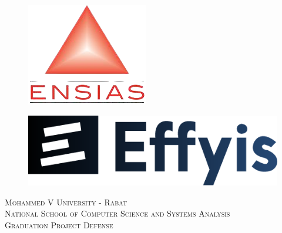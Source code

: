 \begin{titlepage}
\newcommand{\HRule}{\rule{\linewidth}{0.5mm}}
\centering
\begin{figure}[h]
  \centering
  \begin{minipage}{0.2\textwidth}
    \centering
    \includegraphics[width=\textwidth]{img/logos/ensias-removebg-preview.png}
    \label{fig:ensias}
  \end{minipage}
  \hfill
  \begin{minipage}{0.33\textwidth}
    \centering
    \includegraphics[width=\textwidth]{img/effyis.png}
    \label{fig:effyis}
  \end{minipage}
\end{figure}

\textsc{\Large Mohammed V University - Rabat}\\[0.5cm]
\textsc{\large National School of Computer Science and Systems Analysis}\\[0.5cm]
\textsc{\large Graduation Project Defense}\\[0.5cm]


\end{titlepage}
